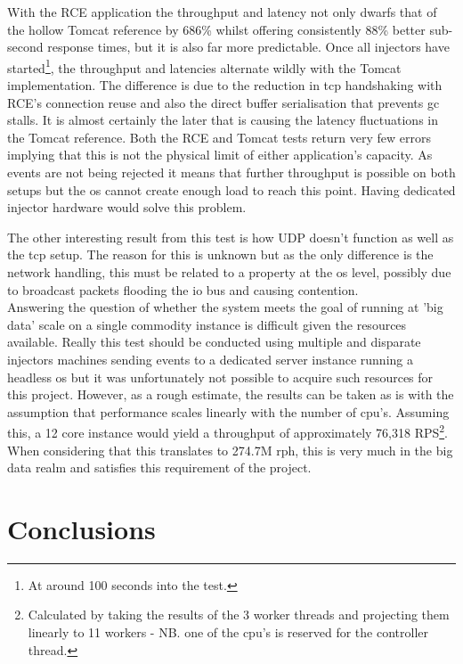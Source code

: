\documentclass[a4paper,11pt]{scrreprt}
\begin{document}
With the RCE application the throughput and latency not only dwarfs that of the hollow Tomcat reference by 686\% whilst offering consistently 88\% better sub-second response times, but it is also far more predictable. Once all injectors have started\footnote{At around 100 seconds into the test.}, the throughput and latencies alternate wildly with the Tomcat implementation. The difference is due to the reduction in \acrshort{tcp} handshaking with RCE's connection reuse and also the direct buffer serialisation that prevents \acrshort{gc} stalls. It is almost certainly the later that is causing the latency fluctuations in the Tomcat reference. Both the RCE and Tomcat tests return very few errors implying that this is not the physical limit of either application's capacity. As events are not being rejected it means that further throughput is possible on both setups but the \acrshort{os} cannot create enough load to reach this point. Having dedicated injector hardware would solve this problem. \

The other interesting result from this test is how UDP doesn't function as well as the \acrshort{tcp} setup. The reason for this is unknown but as the only difference is the network handling, this must be related to a property at the \acrshort{os} level, possibly due to broadcast packets flooding the \acrshort{io} bus and causing contention. \\

Answering the question of whether the system meets the goal of running at 'big data' scale on a single commodity instance is difficult given the resources available. Really this test should be conducted using multiple and disparate injectors machines sending events to a dedicated server instance running a headless \acrshort{os} but it was unfortunately not possible to acquire such resources for this project. However, as a rough estimate, the results can be taken as is with the assumption that performance scales linearly with the number of \acrshort{cpu}'s. Assuming this, a 12 core instance would yield a throughput of approximately 76,318 RPS\footnote{Calculated by taking the results of the 3 worker threads and projecting them linearly to 11 workers - NB. one of the \acrshort{cpu}'s is reserved for the controller thread.}. When considering that this translates to 274.7M \acrshort{rph}, this is very much in the big data realm and satisfies this requirement of the project.

\chapter{Conclusions}
\end{document}
